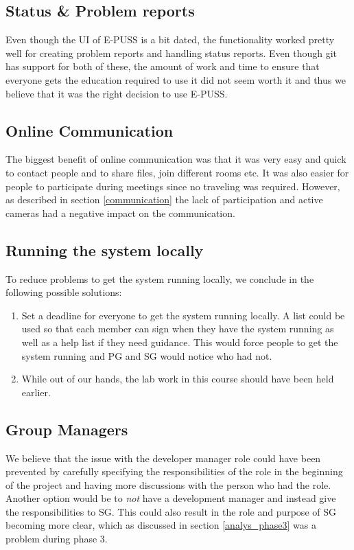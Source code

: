 \documentclass{article}
\begin{document}
    \subsection{Status \& Problem reports}
        Even though the UI of E-PUSS is a bit dated, the functionality worked
        pretty well for creating problem reports and handling status reports.
        Even though git has support for both of these, the amount of work and time to ensure
        that everyone gets the education required to use it did not seem worth it and thus
        we believe that it was the right decision to use E-PUSS.
    
    \subsection{Online Communication}
        The biggest benefit of online communication was that it was very easy and quick to
        contact people and to share files, join different rooms etc. It was also easier for
        people to participate during meetings since no traveling was required.
        However, as described in section \ref{communication} the lack of participation and active cameras
        had a negative impact on the communication.
    
    \subsection{Running the system locally \label{analyse_system}}
        To reduce problems to get the system running locally, 
        we conclude in the following possible solutions:
        \begin{enumerate}
            \item Set a deadline for everyone to get the system running locally. 
                    A list could be used so that each member can sign when they have
                    the system running as well as a help list if they need guidance.
                    This would force people to get the system running and PG and SG
                    would notice who had not.
            \item While out of our hands, the lab work in this course should have been held earlier.
        \end{enumerate}
        
    \subsection{Group Managers}
        We believe that the issue with the developer manager role could have been prevented by carefully specifying the responsibilities of the
        role in the beginning of the project and having more discussions with the person who had the role.
        Another option would be to \emph{not} have a development manager
        and instead give the responsibilities to SG. This could also result in the role and purpose of 
        SG becoming more clear, which as discussed in section \ref{analys_phase3} was a problem during phase 3.
\end{document}
